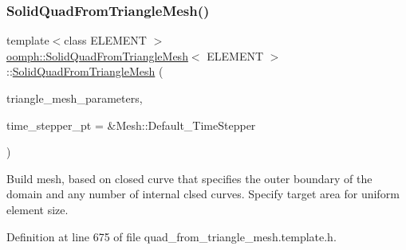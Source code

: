 \mbox{\label{classoomph_1_1SolidQuadFromTriangleMesh_a2840a2b887344189d0921c9d6ff2cf63}} 
\subsubsection{\texorpdfstring{Solid\+Quad\+From\+Triangle\+Mesh()}{SolidQuadFromTriangleMesh()}\hspace{0.1cm}{\footnotesize\ttfamily [2/2]}}
{\footnotesize\ttfamily template$<$class E\+L\+E\+M\+E\+NT $>$ \\
\hyperlink{classoomph_1_1SolidQuadFromTriangleMesh}{oomph\+::\+Solid\+Quad\+From\+Triangle\+Mesh}$<$ E\+L\+E\+M\+E\+NT $>$\+::\hyperlink{classoomph_1_1SolidQuadFromTriangleMesh}{Solid\+Quad\+From\+Triangle\+Mesh} (\begin{DoxyParamCaption}\item[{\hyperlink{classoomph_1_1TriangleMeshParameters}{Triangle\+Mesh\+Parameters} \&}]{triangle\+\_\+mesh\+\_\+parameters,  }\item[{Time\+Stepper $\ast$}]{time\+\_\+stepper\+\_\+pt = {\ttfamily \&Mesh\+:\+:Default\+\_\+TimeStepper} }\end{DoxyParamCaption})\hspace{0.3cm}{\ttfamily [inline]}}



Build mesh, based on closed curve that specifies the outer boundary of the domain and any number of internal clsed curves. Specify target area for uniform element size. 



Definition at line 675 of file quad\+\_\+from\+\_\+triangle\+\_\+mesh.\+template.\+h.

\mbox{\label{classoomph_1_1SolidQuadFromTriangleMesh_af9aaccc5a15dfefab81b91b059217aa3}} 
